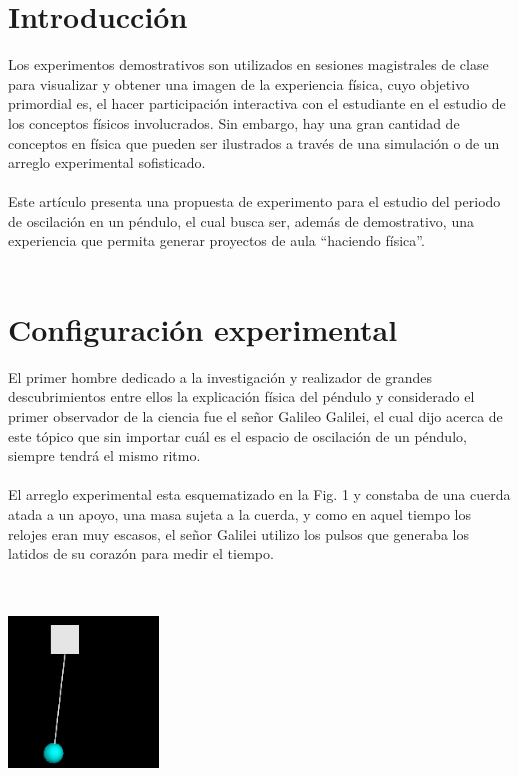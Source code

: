 \documentclass[12pt]{article}
\newenvironment{Figure}
{\par\medskip\noindent\minipage{\linewidth}}
{\endminipage\par\medskip}
\begin{document}
\begin{multicols}{2}

\section{Introducción}
Los experimentos demostrativos son utilizados en sesiones magistrales de clase para visualizar y obtener una imagen de la experiencia física, cuyo objetivo primordial es, el hacer participación interactiva con el estudiante\cite{REDISH} en el estudio de los conceptos físicos involucrados. Sin embargo, hay una gran cantidad de conceptos en física que pueden ser ilustrados a través de una simulación o de un arreglo experimental sofisticado.\\ \\ Este artículo presenta una propuesta de experimento para el estudio del periodo de oscilación en un péndulo, el cual busca ser, además de demostrativo, una experiencia que permita generar proyectos de aula ``haciendo física''.
\\ \\

\section{Configuración experimental}
El primer hombre dedicado a la investigación\cite{GALILEO} y realizador de grandes descubrimientos entre ellos la explicación física del péndulo y considerado el primer observador de la ciencia fue el señor Galileo Galilei, el cual dijo acerca de este tópico que sin importar cuál es el espacio de oscilación de un péndulo, siempre tendrá el mismo ritmo. 
\\ \\
El arreglo experimental esta esquematizado en la Fig. 1 y constaba de una cuerda atada a un apoyo, una masa sujeta a la cuerda, y como en aquel tiempo los relojes eran muy escasos, el señor Galilei\cite{GALILEO} utilizo los pulsos que generaba los latidos de su corazón para medir el tiempo.
\\\\
\begin{Figure}
\center
\includegraphics[width=4.0cm, height=5cm] {fig/fig1.png}
\label{fig:g1}
\end{Figure}


\end{multicols}
\end{document}
